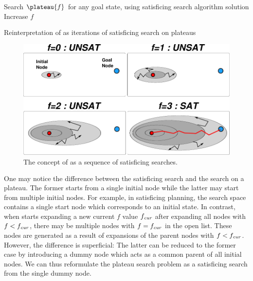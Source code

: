 \begin{algorithm}
 \begin{algorithmic}
  \LOOP
  \STATE Search $\plateau{f}$ for any goal state, using satisficing search algorithm
  \RETURN solution
  \ELSE
  \STATE Increase $f$ 
  \ENDIF
  \ENDLOOP
 \end{algorithmic}
 \caption{Reinterpretation of \astar as iterations of satisficing search on plateaus}
 \label{alg:astar-sat}
\end{algorithm}

\begin{figure}[htbp]
 \centering
 \includegraphics[width=0.8\linewidth]{img/astar/plateau-5.pdf}
 \caption{The concept of \astar as a sequence of satisficing searches.}
 \label{fig:astar-sat}
\end{figure}

One may notice the difference between the satisficing search and the search on a plateau.
The former starts from a single initial node while the latter may start from multiple initial nodes.
For example, in satisficing planning, the search space contains a single start node which corresponds to an initial state.
% 
In contrast, when \astar starts expanding a new current $f$ value $f_{\mit{cur}}$ after expanding all nodes with $f<f_\mit{cur}$,
there may be multiple nodes with $f=f_\mit{cur}$ in the open list.
These nodes are generated as a result of expansions of the parent nodes with $f<f_\mit{cur}$.
% 
However, the difference is superficial: The latter can be reduced to the former case by introducing a dummy node
which acts as a common parent of all initial nodes. We can thus reformulate the plateau search problem as a satisficing search from the single dummy node.

